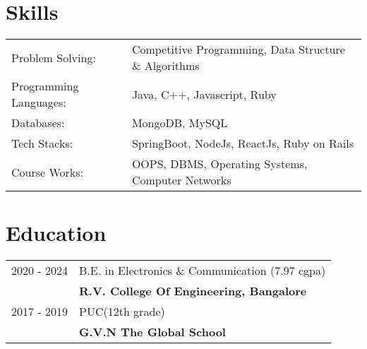 \documentclass[a4paper,11pt]{article}
\begin{document}
















\section{Skills}
\begin{tabularx}{\linewidth}{@{}l X@{}}
Problem Solving: &  \normalsize{Competitive Programming, Data Structure \& Algorithms}\\
Programming Languages:  &  \normalsize{Java, C++, Javascript, Ruby}\\  
Databases:  &  \normalsize{MongoDB, MySQL}\\  
Tech Stacks:  &  \normalsize{SpringBoot, NodeJs, ReactJs, Ruby on Rails}\\
Course Works:  & \normalsize{OOPS, DBMS, Operating Systems, Computer Networks}\\
\end{tabularx}


\section{Education}
\begin{tabularx}{\linewidth}{@{}l X@{}}	
2020 - 2024 & B.E. in Electronics \& Communication (7.97 cgpa) \hfill \normalsize \\
 & \textbf{R.V. College Of Engineering, Bangalore} \\  
2017 - 2019 & PUC(12th grade) \hfill \normalsize \\
 & \textbf{G.V.N The Global School}\\ 


\end{tabularx}
\end{document}
